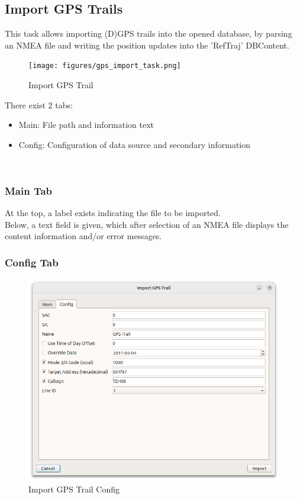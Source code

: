 \subsection{Import GPS Trails}
\label{sec:ui_import_gps}

This task allows importing (D)GPS trails into the opened database, by parsing an NMEA file and writing the position updates into the 'RefTraj' DBContent.

\begin{figure}[H]
  \center
    \texttt{[image: figures/gps\_import\_task.png]}
  \caption{Import GPS Trail}
\end{figure}

There exist 2 tabs:

\begin{itemize}
\item Main: File path and information text
\item Config: Configuration of data source and secondary information
\end{itemize}
\ \\

\subsubsection{Main Tab}

At the top, a label exists indicating the file to be imported. \\

Below, a text field is given, which after selection of an NMEA file displays the content information and/or error messages. \\

\subsubsection{Config Tab}

\begin{figure}[H]
    \includegraphics[width=16cm]{figures/gps_import_config.png}
  \caption{Import GPS Trail Config}
\end{figure}

